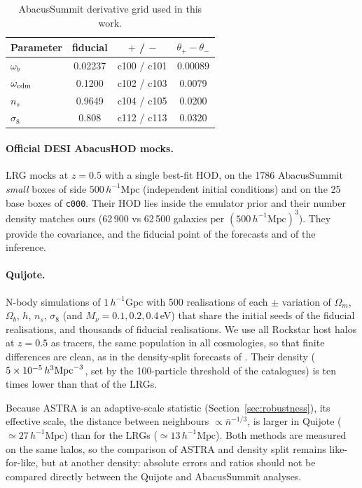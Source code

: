 \documentclass[11pt,twocolumn]{article}
\newcommand{\Mpch}{\,h^{-1}\mathrm{Mpc}}
\begin{document}
\begin{table}[h]
\centering\small
\begin{tabular}{lccc}
\toprule
Parameter & fiducial & $+$ / $-$ & $\theta_+-\theta_-$ \\
\midrule
$\omega_b$ & 0.02237 & c100 / c101 & 0.00089 \\
$\omega_{\rm cdm}$ & 0.1200 & c102 / c103 & 0.0079 \\
$n_s$ & 0.9649 & c104 / c105 & 0.0200 \\
$\sigma_8$ & 0.808 & c112 / c113 & 0.0320 \\
\bottomrule
\end{tabular}
\caption{AbacusSummit derivative grid used in this work.}
\label{tab:cosmo}
\end{table}

\paragraph{Official DESI AbacusHOD mocks.} LRG mocks at $z=0.5$ \cite{Yuan2022} with a single best-fit HOD, on the 1786 AbacusSummit \emph{small} boxes of side $500\Mpch$ (independent initial conditions) and on the 25 base boxes of \texttt{c000}. Their HOD lies inside the emulator prior and their number density matches ours (62\,900 vs 62\,500 galaxies per $(500\Mpch)^3$). They provide the covariance, and the fiducial point of the forecasts and of the inference.

\paragraph{Quijote.} N-body simulations \cite{Quijote} of $1\,h^{-1}$Gpc with 500 realisations of each $\pm$ variation of $\Omega_m$, $\Omega_b$, $h$, $n_s$, $\sigma_8$ (and $M_\nu=0.1,0.2,0.4$\,eV) that share the initial seeds of the fiducial realisations, and thousands of fiducial realisations. We use all Rockstar host halos at $z=0.5$ as tracers, the same population in all cosmologies, so that finite differences are clean, as in the density-split forecasts of \cite{Paillas2023}. Their density ($5\times10^{-5}\,h^3{\rm Mpc}^{-3}$, set by the 100-particle threshold of the catalogues) is ten times lower than that of the LRGs.

Because ASTRA is an adaptive-scale statistic (Section~\ref{sec:robustness}), its effective scale, the distance between neighbours $\propto\bar n^{-1/3}$, is larger in Quijote ($\simeq27\Mpch$) than for the LRGs ($\simeq13\Mpch$). Both methods are measured on the same halos, so the comparison of ASTRA and density split remains like-for-like, but at another density: absolute errors and ratios should not be compared directly between the Quijote and AbacusSummit analyses.
\end{document}
